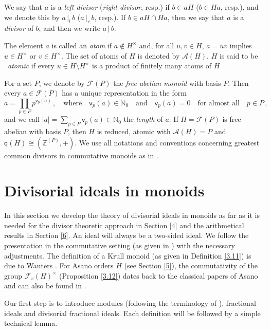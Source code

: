 \documentclass[a4paper]{amsart}
\theoremstyle{definition}
\numberwithin{equation}{section}
\begin{document}
We say that $a$ is a {\it left divisor} ({\it right divisor}, resp.)
if $b \in aH$ ($b \in Ha$, resp.), and we denote this by $a {\, |_l \,} b$
($a {\, |_r \,} b$, resp.). If $b \in aH \cap Ha$, then we say that $a$ is a
{\it divisor} of $b$, and then we write $a {\, | \,} b$.

The element $a$ is called an  {\it atom}  if $a
      \notin H^{\times}$ and, for all $u, v  \in H$,  $a = u v$ implies
      $u \in H^{\times}$ or $v \in H^{\times}$. The set of atoms of $H$
      is denoted by $\mathcal A (H)$. $H$ is said to be \ {\it atomic}
      if every $u \in H \setminus H^{\times}$ is a product of finitely many atoms of $H$

For a set $P$, we denote by $\mathcal F (P)$ the {\it free abelian
monoid} with basis $P$. Then every $a \in \mathcal F (P)$ has a
unique representation in the form
\[
a = \prod_{p \in P} p^{\mathsf v_p (a)} \,, \quad \text{where} \quad
\mathsf v_p (a) \in \mathbb N_0 \quad \text{and} \quad \mathsf v_p
(a) = 0 \quad \text{for almost all} \quad p \in P \,,
\]
and we call $|a| = \sum_{p \in P} \mathsf v_p (a) \in \mathbb N_0$
the {\it length} of $a$. If $H = \mathcal F (P)$ is free abelian
with basis $P$, then $H$ is reduced, atomic with $\mathcal A (H) =
P$ and $\mathsf q (H) \cong ({\mathbb Z}^{(P)}, +)$. We use all notations and conventions concerning greatest common divisors in commutative monoids as in \cite[Chapter 10]{HK98}.

\bigskip
\section{Divisorial ideals in monoids} \label{3}
\bigskip

In this section we develop the theory of divisorial ideals in
monoids as far as it is needed for the divisor theoretic approach in
Section \ref{4} and the arithmetical results in Section \ref{6}. An ideal will always be a two-sided ideal. We
follow the presentation in the commutative setting (as given in
\cite{HK98, Ge-HK06a}) with the necessary adjustments. The
definition of a Krull monoid (as given in Definition \ref{3.11}) is
due to  Wauters \cite{Wa84a}. For Asano orders $H$ (see Section
\ref{5}), the commutativity of the group $\mathcal F_v (H)^{\times}$
(Proposition \ref{3.12}) dates back to the classical papers of Asano
and can also be found in \cite[Chapter II, $\S$ 2]{Ma-Ra80a}.

Our first step is to introduce modules (following the terminology of \cite{HK10b}),
fractional ideals and divisorial fractional ideals. Each definition
will be followed by a simple technical lemma.
\end{document}
